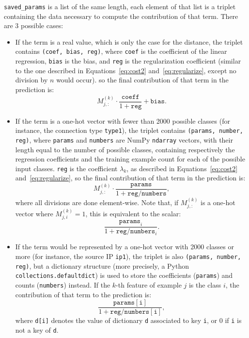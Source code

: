 \documentclass[10pt,a4paper,notitlepage,twocolumn]{article}
\begin{document}
\verb|saved_params| is a list of the same length, each element of
that list is a triplet containing the data necessary to compute the
contribution of that term. There are 3 possible cases:
\begin{itemize}

  \item If the term is a real value, which is only the case for
  the distance, the triplet contains \verb|(coef, bias, reg)|,
  where \verb|coef| is the coefficient of the linear regression,
  \verb|bias| is the bias, and \verb|reg| is the regularization
  coefficient (similar to the one described in Equations~\ref{eq:cost2}
  and~\ref{eq:regularize}, except no division by $n$ would occur).
  so the final contribution of that term in the prediction is:
  \begin{equation}
    M^{(k)}_{j,:} \cdot \frac{\mathtt{coeff}}{1 + \mathtt{reg}} + \mathtt{bias}.
  \end{equation}

  \item If the term is a one-hot vector with fewer than 2000 possible
  classes (for instance, the connection type \verb|type1|),
  the triplet contains \verb|(params, number, reg)|, where \verb|params|
  and \verb|numbers| are NumPy \verb|ndarray| vectors, with their length
  equal to the number of possible classes, containing respectively the
  regression coefficients and the training example count for each of the
  possible input classes.
  \verb|reg| is the coefficient $\lambda_k$, as described in Equations~\ref{eq:cost2}
  and~\ref{eq:regularize}, so the final contribution of that term
  in the prediction is:
  \begin{equation}
    M^{(k)}_{j,:} \cdot \frac{\mathtt{params}}{1 + \mathtt{reg} / \mathtt{numbers}},
  \end{equation}
  where all divisions are done element-wise.
  Note that, if $M^{(k)}_{j,:}$ is a one-hot vector where $M^{(k)}_{j,i} = 1$,
  this is equivalent to the scalar:
  \begin{equation}
    \frac{\mathtt{params}_i}{1 + \mathtt{reg} / \mathtt{numbers}_i}.
  \end{equation}

  \item If the term would be represented by a one-hot vector with 2000
  classes or more (for instance, the source IP \verb|ip1|), the triplet
  is also \verb|(params, number, reg)|, but a dictionary structure (more
  precisely, a Python \verb|collections.defaultdict|) is used to store
  the coefficients (\verb|params|) and counts (\verb|numbers|) instead.
  If the $k$-th feature of example $j$ is the class $i$, the contribution
  of that term to the prediction is:
  \begin{equation}
    \frac{\mathtt{params[i]}}{1 + \mathtt{reg} / \mathtt{numbers[i]}},
  \end{equation}
  where \verb|d[i]| denotes the value of dictionary \verb|d| associated
  to key \verb|i|, or 0 if \verb|i| is not a key of \verb|d|.

\end{itemize}
\end{document}
